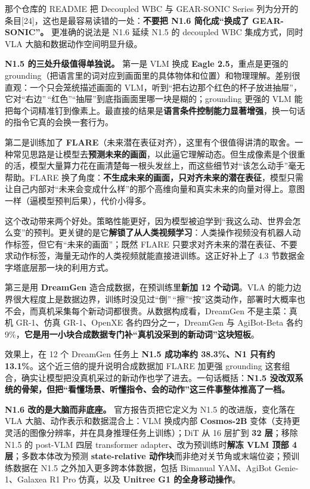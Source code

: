 \documentclass[
  chinese,
]{ctexart}
\begin{document}
那个仓库的 README 把 Decoupled WBC 与 GEAR-SONIC Series
列为分开的条目{[}24{]}，这也是最容易读错的一处：\textbf{不要把 N1.6
简化成``换成了 GEAR-SONIC''。} 更准确的说法是 N1.6 延续 N1.5 的
decoupled WBC 集成方式，同时 VLA 大脑和数据动作空间明显升级。

\textbf{N1.5 的三处升级值得单独说。} 第一是 VLM 换成 \textbf{Eagle
2.5}，重点是更强的
grounding（把语言里的词对应到画面里的具体物体和位置）和物理理解。差别很直观：一个只会笼统描述画面的
VLM，听到``把右边那个红色的杯子放进抽屉''，它对``右边''\,``红色''``抽屉''到底指画面里哪一块是糊的；grounding
更强的 VLM
能把每个词精准钉到像素上。最直接的结果是\textbf{语言条件控制能力显著增强}，换一句话的指令它真的会换一套行为。

第二是训练加了
\textbf{FLARE}（未来潜在表征对齐），这里有个很值得讲清的取舍。一种常见思路是让模型去\textbf{预测未来的画面}，以此逼它理解动态。但生成像素是个很重的活，模型大量算力花在画清楚每一根头发丝上，而这些细节对``该怎么动手''毫无帮助。FLARE
换了角度：\textbf{不生成未来的画面，只对齐未来的潜在表征}，模型只需让自己内部对``未来会变成什么样''的那个高维向量和真实未来的向量对得上。意图一样（逼模型预判后果），代价小得多。

这个改动带来两个好处。策略性能更好，因为模型被迫学到``我这么动、世界会怎么变''的预判。更关键的是它\textbf{解锁了从人类视频学习}：人类操作视频没有机器人动作标签，但它有``未来的画面''；既然
FLARE
只要求对齐未来的潜在表征、不要求动作标签，海量无动作的人类视频就能直接进训练。这正好补上了
4.3 节数据金字塔底层那一块的利用方式。

第三是用 \textbf{DreamGen} 造合成数据，在预训练里\textbf{新加 12
个动词}。VLA
的能力边界很大程度上是数据边界，训练时没见过``倒''\,``擦''``按''这类动作，部署时大概率也不会，而真机采集每个新动词都很贵。从数据构成看，DreamGen
不是主菜：真机 GR-1、仿真 GR-1、OpenXE 各约四分之一，DreamGen 与
AgiBot-Beta 各约
9\%，\textbf{它是用一小块合成数据专门补``真机没采到的新动词''这块短板}。

效果上，在 12 个 DreamGen 任务上 \textbf{N1.5 成功率约 38.3\%、N1 只有约
13.1\%}。这个近三倍的提升说明合成数据加 FLARE 加更强 grounding
这套组合，确实让模型把没真机采过的新动作也学了进去。一句话概括：\textbf{N1.5
没改双系统的骨架，但把``看懂场景、听懂指令、会的动作''这三件事整体推高了一档。}

\textbf{N1.6 改的是大脑而非底座。} 官方报告页把它定义为 N1.5
的改进版，变化落在 VLA 大脑、动作表示和数据混合上：VLM 换成内部
\textbf{Cosmos-2B}
变体（支持更灵活的图像分辨率，并在具身推理任务上训练）；DiT 从 16 层扩到
\textbf{32 层}；移除 N1.5 的 post-VLM 四层 transformer
adapter、改为预训练时\textbf{解冻 VLM 顶部 4 层}；多数本体改为预测
\textbf{state-relative 动作块}而非绝对关节角或末端位姿；预训练数据在
N1.5 之外加入更多跨本体数据，包括 Bimanual YAM、AgiBot Genie-1、Galaxea
R1 Pro 仿真，以及 \textbf{Unitree G1 的全身移动操作}。
\end{document}
